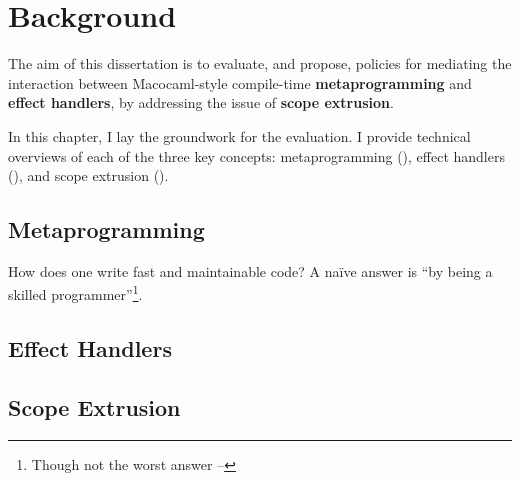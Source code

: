 \chapter{Background}
The aim of this dissertation is to evaluate, and propose, policies for mediating the interaction between Macocaml-style compile-time \textbf{metaprogramming} and \textbf{effect handlers}, by addressing the issue of \textbf{scope extrusion}.

In this chapter, I lay the groundwork for the evaluation. I provide technical overviews of each of the three key concepts: metaprogramming (), effect handlers (), and scope extrusion ().

\section{Metaprogramming}\label{section:metaprogramming-technical}
How does one write fast and maintainable code? A naïve answer is ``by being a skilled programmer''\footnote{Though not the worst answer -- }. 


\section{Effect Handlers}\label{section:effects-technical}

\section{Scope Extrusion}\label{section:scope-extrusion-technical}